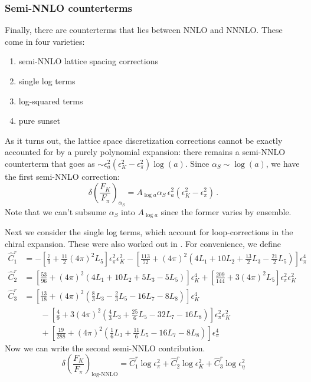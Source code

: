 \documentclass[prd,tightenlines,preprintnumbers,showpacs,superscriptaddress,notitlepage,eqsecnum,floatfix,notitlepage]{revtex4-1}
\begin{document}
\subsubsection{Semi-NNLO counterterms} \label{section:semi_nnlo}
Finally, there are counterterms that lies between NNLO and NNNLO. These come in four varieties: 
\begin{enumerate}
	\item semi-NNLO lattice spacing corrections
	\item single log terms
	\item log-squared terms
	\item pure sunset
\end{enumerate}
As it turns out, the lattice space discretization corrections cannot be exactly accounted for by a purely polynomial expansion: there remains a semi-NNLO counterterm that goes as $\sim \epsilon_a^2 (\epsilon_K^2 - \epsilon_\pi^2) \log(a)$. Since $\alpha_S \sim \log(a)$, we have the first semi-NNLO correction:
\begin{equation}
\delta\left(\frac{F_K}{F_\pi}\right)_{\alpha_S} =
A_{\log a} \alpha_S \, \epsilon_a^2  (\epsilon_K^2 - \epsilon_\pi^2) \, .
\end{equation}
Note that we can't subsume $\alpha_S$ into $A_{\log a}$ since the former varies by ensemble. 

Next we consider the single log terms, which account for loop-corrections in the chiral expansion. These were also worked out in \cite{Ananthanarayan:2017qmx}. For convenience, we define
\begin{align}
\hat C^r_1 
&= - \left[ \frac{7}{9} + \frac{11}{2} (4 \pi)^2 L_5 \right] \epsilon_\pi^2 \epsilon_K^2
- \left[ \frac{113}{72} + (4 \pi)^2 \left( 
4 L_1 + 10 L_2 + \frac{13}{2} L_3 - \frac{21}{2} L_5
\right) \right] \epsilon_\pi^4\\
\hat C^r_2 
&=   \left[ \frac{53}{96} + (4 \pi)^2 \left( 
4 L_1 + 10 L_2 + 5 L_3 - 5 L_5
\right) \right] \epsilon_K^4
+ \left[ \frac{209}{144} + 3 (4 \pi)^2 L_5 \right] \epsilon_\pi^2 \epsilon_K^2 \\
\hat C^r_3
&=   \left[ \frac{13}{18} + (4 \pi)^2 \left( 
\frac 83 L_3 - \frac 23 L_5 -16 L_7 - 8 L_8
\right) \right] \epsilon_K^4 \\
&\qquad 
- \left[ \frac{4}{9} + 3 (4 \pi)^2 \left(
\frac 43 L_3 + \frac {25}{6} L_5 -32 L_7 - 16 L_8
\right) \right] \epsilon_\pi^2 \epsilon_K^2 \nonumber \\
&\qquad 
+ \left[ \frac{19}{288} + (4 \pi)^2 \left( 
\frac 16 L_3 + \frac{11}{6} L_5 -16 L_7 - 8 L_8
\right) \right] \epsilon_\pi^4 \nonumber
\end{align}
Now we can write the second semi-NNLO contribution.
\begin{equation}
\delta\left(\frac{F_K}{F_\pi}\right)_\text{log-NNLO} =
\hat C^r_1 \log \epsilon_\pi^2
+\hat  C^r_2  \log \epsilon_K^2
+\hat  C^r_3 \log \epsilon_\eta^2
\end{equation}
\end{document}
